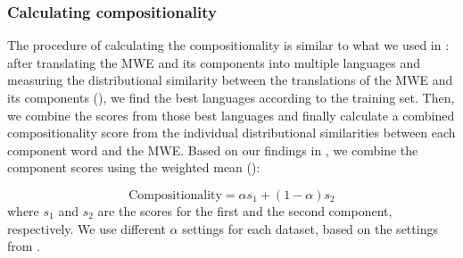 \documentclass[output=paper,modfonts,nonflat]{langsci/langscibook}
\begin{document}
\subsubsection{Calculating compositionality}
\label{sec:computing-compositionality}
The procedure of calculating the compositionality is similar to what
we used in : after translating the MWE and its
components into multiple languages and measuring the distributional
similarity between the translations of the MWE and its components
(), we find the best languages according to the
training set. Then, we combine the scores from those best languages
and finally calculate a combined compositionality score from the
individual distributional similarities between each component word and
the MWE. Based on our findings in , we combine the
component scores using the weighted mean ():

\begin{equation}
  \text{Compositionality} = \alpha s_{1} + (1-\alpha) s_{2}
  \label{eq:comp}
\end{equation} 
where $s_{1}$ and $s_{2}$ are the scores for the first and the second
component, respectively. We use different $\alpha$ settings for each
dataset, based on the settings from .
\end{document}
